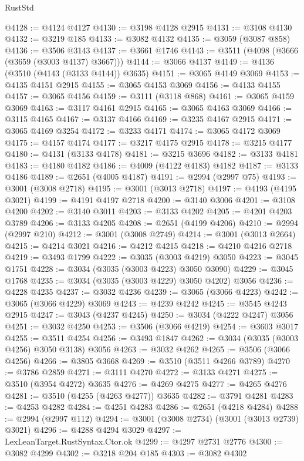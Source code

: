\begin{lexlean}{RustStd}
\begin{coremodule}
@4128 := @4124 @4127
@4130 := @3198 @4128 @2915
@4131 := @3108 @4130
@4132 := @3219 @185
@4133 := @3082 @4132
@4135 := @3059 (@3087 @858)
@4136 := @3506 @3143
@4137 := @3661 @1746
@4143 := @3511 (@4098 (@3666 (@3659 (@3003 @4137) @3667)))
@4144 := @3066 @4137
@4149 := @4136 (@3510 (@4143 (@3133 @4144)) @3635)
@4151 := @3065 @4149 @3069
@4153 := @4135 @4151 @2915
@4155 := @3065 @4153 @3069
@4156 := @4133 @4155
@4157 := @3065 @4156
@4159 := @3111 (@3118 @868)
@4161 := @3065 @4159 @3069
@4163 := @3117 @4161 @2915
@4165 := @3065 @4163 @3069
@4166 := @3115 @4165
@4167 := @3137 @4166
@4169 := @3235 @4167 @2915
@4171 := @3065 @4169 @3254
@4172 := @3233 @4171
@4174 := @3065 @4172 @3069
@4175 := @4157 @4174
@4177 := @3217 @4175 @2915
@4178 := @3215 @4177
@4180 := @4131 (@3133 @4178)
@4181 := @3215 @3696
@4182 := @3133 @4181
@4183 := @4180 @4182
@4186 := @4009 (@4122 @4183) @4182
@4187 := @3133 @4186
@4189 := @2651 (@4005 @4187)
@4191 := @2994 (@2997 @75)
@4193 := @3001 (@3008 @2718)
@4195 := @3001 (@3013 @2718)
@4197 := @4193 (@4195 @3021)
@4199 := @4191 @4197 @2718
@4200 := @3140 @3006
@4201 := @3108 @4200
@4202 := @3140 @3011
@4203 := @3133 @4202
@4205 := @4201 @4203 @3789
@4206 := @3133 @4205
@4208 := @2651 (@4199 @4206)
@4210 := @2994 (@2997 @210)
@4212 := @3001 (@3008 @2749)
@4214 := @3001 (@3013 @2664)
@4215 := @4214 @3021
@4216 := @4212 @4215
@4218 := @4210 @4216 @2718
@4219 := @3493 @1799
@4222 := @3035 (@3003 @4219) @3050
@4223 := @3045 @1751
@4228 := @3034 (@3035 (@3003 @4223) @3050 @3090)
@4229 := @3045 @1768
@4235 := @3034 (@3035 (@3003 @4229) @3050 @4202) @3056
@4236 := @4228 @4235
@4237 := @3032 @4236
@4239 := @3065 (@3066 @4223)
@4242 := @3065 (@3066 @4229) @3069
@4243 := @4239 @4242
@4245 := @3545 @4243 @2915
@4247 := @3043 (@4237 @4245)
@4250 := @3034 (@4222 @4247) @3056
@4251 := @3032 @4250
@4253 := @3506 (@3066 @4219)
@4254 := @3603 @3017
@4255 := @3511 @4254
@4256 := @3493 @1847
@4262 := @3034 (@3035 (@3003 @4256) @3050 @3138) @3056
@4263 := @3032 @4262
@4265 := @3506 (@3066 @4256)
@4266 := @3805 @3668
@4269 := @3510 (@3511 @4266 @3789)
@4270 := @3786 @2859
@4271 := @3111 @4270
@4272 := @3133 @4271
@4275 := @3510 (@3954 @4272) @3635
@4276 := @4269 @4275
@4277 := @4265 @4276
@4281 := @3510 (@4255 (@4263 @4277)) @3635
@4282 := @3791 @4281
@4283 := @4253 @4282
@4284 := @4251 @4283
@4286 := @2651 (@4218 @4284)
@4288 := @2994 (@2997 @112)
@4294 := @3001 (@3008 @2734) (@3001 (@3013 @2739) @3021)
@4296 := @4288 @4294 @3029
@4297 := LexLeanTarget.RustSyntax.Ctor.ok
@4299 := @4297 @2731 @2776
@4300 := @3082 @4299
@4302 := @3218 @204 @185
@4303 := @3082 @4302

\end{coremodule}
\end{lexlean}
